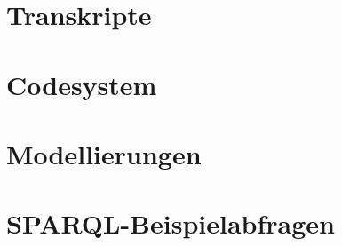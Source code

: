 \section{Transkripte}
\section{Codesystem}
\section{Modellierungen}
\section{SPARQL-Beispielabfragen}